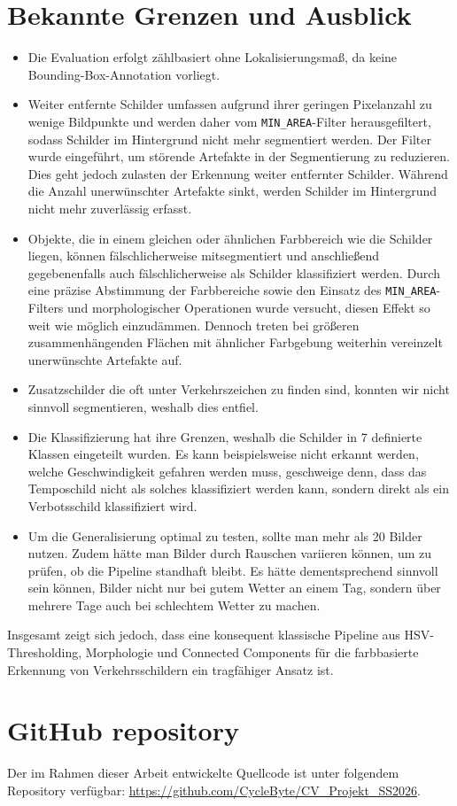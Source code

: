 \documentclass[12pt,oneside]{article}
\begin{document}
\section{Bekannte Grenzen und Ausblick}
\label{sec:grenzen}

\begin{itemize}
\item Die Evaluation erfolgt zählbasiert ohne Lokalisierungsmaß, da keine Bounding-Box-Annotation vorliegt.

\item Weiter entfernte Schilder umfassen aufgrund ihrer geringen Pixelanzahl zu wenige Bildpunkte und werden daher vom \texttt{MIN\_AREA}-Filter herausgefiltert, sodass Schilder im Hintergrund nicht mehr segmentiert werden. Der Filter wurde eingeführt, um störende Artefakte in der Segmentierung zu reduzieren. Dies geht jedoch zulasten der Erkennung weiter entfernter Schilder. Während die Anzahl unerwünschter Artefakte sinkt, werden Schilder im Hintergrund nicht mehr zuverlässig erfasst.

\item Objekte, die in einem gleichen oder ähnlichen Farbbereich wie die Schilder liegen, können fälschlicherweise mitsegmentiert und anschließend gegebenenfalls auch fälschlicherweise als Schilder klassifiziert werden. Durch eine präzise Abstimmung der Farbbereiche sowie den Einsatz des \texttt{MIN\_AREA}-Filters und morphologischer Operationen wurde versucht, diesen Effekt so weit wie möglich einzudämmen. Dennoch treten bei größeren zusammenhängenden Flächen mit ähnlicher Farbgebung weiterhin vereinzelt unerwünschte Artefakte auf.

\item Zusatzschilder die oft unter Verkehrszeichen zu finden sind, konnten wir nicht sinnvoll segmentieren, weshalb dies entfiel.
\item Die Klassifizierung hat ihre Grenzen, weshalb die Schilder in 7 definierte Klassen eingeteilt wurden. Es kann beispielsweise nicht erkannt werden, welche Geschwindigkeit gefahren werden muss, geschweige denn, dass das Temposchild nicht als solches klassifiziert werden kann, sondern direkt als ein Verbotsschild klassifiziert wird.
\item Um die Generalisierung optimal zu testen, sollte man mehr als 20 Bilder nutzen. Zudem hätte man Bilder durch Rauschen variieren können, um zu prüfen, ob die Pipeline standhaft bleibt. Es hätte dementsprechend sinnvoll sein können, Bilder nicht nur bei gutem Wetter an einem Tag, sondern über mehrere Tage auch bei schlechtem Wetter zu machen.
\end{itemize}

Insgesamt zeigt sich jedoch, dass eine konsequent klassische Pipeline aus HSV-Thresholding, Morphologie und Connected Components für die farbbasierte Erkennung von Verkehrsschildern ein tragfähiger Ansatz ist.

\appendix
\section{GitHub repository}
Der im Rahmen dieser Arbeit entwickelte Quellcode ist unter folgendem Repository verfügbar: \url{https://github.com/CycleByte/CV_Projekt_SS2026}.
\end{document}
